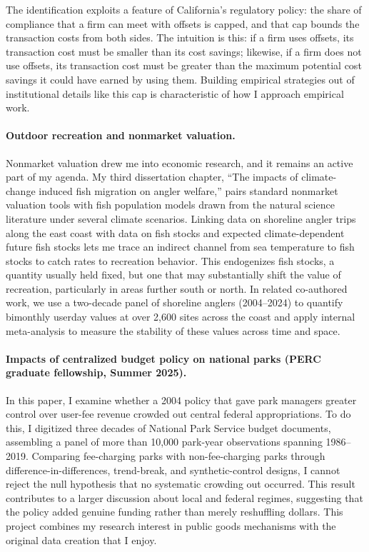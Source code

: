 \documentclass[12pt]{article}
\begin{document}
The identification exploits a feature of California's regulatory policy: the share of compliance that a firm can meet with offsets is capped, and that cap bounds the transaction costs from both sides. The intuition is this: if a firm uses offsets, its transaction cost must be smaller than its cost savings; likewise, if a firm does not use offsets, its transaction cost must be greater than the maximum potential cost savings it could have earned by using them. Building empirical strategies out of institutional details like this cap is characteristic of how I approach empirical work.

\paragraph{Outdoor recreation and nonmarket valuation.}

Nonmarket valuation drew me into economic research, and it remains an active part of my agenda. My third dissertation chapter, ``The impacts of climate-change induced fish migration on angler welfare,'' pairs standard nonmarket valuation tools with fish population models drawn from the natural science literature under several climate scenarios. Linking data on shoreline angler trips along the east coast with data on fish stocks and expected climate-dependent future fish stocks lets me trace an indirect channel from sea temperature to fish stocks to catch rates to recreation behavior. This endogenizes fish stocks, a quantity usually held fixed, but one that may substantially shift the value of recreation, particularly in areas further south or north. In related co-authored work, we use a two-decade panel of shoreline anglers (2004--2024) to quantify bimonthly userday values at over 2,600 sites across the coast and apply internal meta-analysis to measure the stability of these values across time and space.

\paragraph{Impacts of centralized budget policy on national parks (PERC graduate fellowship, Summer 2025).}

In this paper, I examine whether a 2004 policy that gave park managers greater control over user-fee revenue crowded out central federal appropriations. To do this, I digitized three decades of National Park Service budget documents, assembling a panel of more than 10,000 park-year observations spanning 1986--2019. Comparing fee-charging parks with non-fee-charging parks through difference-in-differences, trend-break, and synthetic-control designs, I cannot reject the null hypothesis that no systematic crowding out occurred. This result contributes to a larger discussion about local and federal regimes, suggesting that the policy added genuine funding rather than merely reshuffling dollars. This project combines my research interest in public goods mechanisms with the original data creation that I enjoy.
\end{document}
